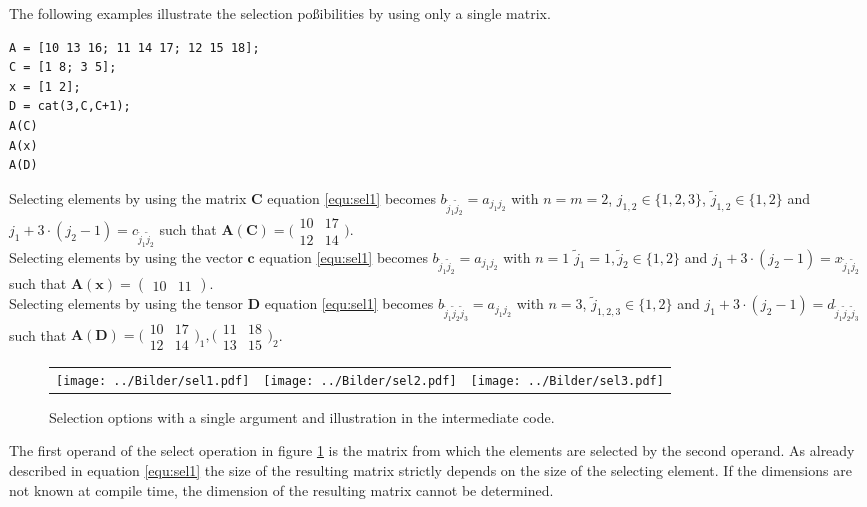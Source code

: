 The following examples illustrate the selection po\ss ibilities by using only a single matrix.
\begin{lstlisting}[caption={Example of equation \ref{equ:sel1}}]
A = [10 13 16; 11 14 17; 12 15 18];
C = [1 8; 3 5];
x = [1 2];
D = cat(3,C,C+1);
A(C)
A(x)
A(D)
\end{lstlisting}
Selecting elements by using the matrix $\mathbf{C}$ equation \ref{equ:sel1} becomes $b_{\tilde{j}_1\tilde{j}_2} = a_{j_1j_2}$ with  $n=m=2$, $j_{1,2}\in\{1,2,3\}$, $\tilde{j}_{1,2}\in\{1,2\}$ and $j_1+3\cdot (j_2-1) = c_{\tilde{j}_1\tilde{j}_2}$ such that $\mathbf{A}(\mathbf{C}) = \bigl( \begin{smallmatrix} 10&17\\12&14 \end{smallmatrix} \bigr)$.\\
Selecting elements by using the vector $\mathbf{c}$ equation \ref{equ:sel1} becomes $b_{\tilde{j}_1\tilde{j}_2} = a_{j_1j_2}$ with  $n=1$ $\tilde{j}_1 =1,\tilde{j}_2\in\{1,2\}$ and $j_1+3\cdot (j_2-1) = x_{\tilde{j}_1\tilde{j}_2}$ such that $\mathbf{A}(\mathbf{x}) = ( \begin{smallmatrix} 10&11\end{smallmatrix} )$.\\
Selecting elements by using the tensor $\mathbf{D}$ equation \ref{equ:sel1} becomes $b_{\tilde{j}_1\tilde{j}_2\tilde{j}_3} = a_{j_1j_2}$ with  $n=3$, $\tilde{j}_{1,2,3}\in\{1,2\}$ and $j_1+3\cdot (j_2-1) = d_{\tilde{j}_1\tilde{j}_2\tilde{j}_3}$ such that $\mathbf{A}(\mathbf{D}) = \bigl( \begin{smallmatrix} 10&17\\12&14 \end{smallmatrix} \bigr)_1, \bigl( \begin{smallmatrix} 11&18\\13&15 \end{smallmatrix} \bigr)_2$.

\begin{figure}[!ht]
\label{fig:sel1}
\centering
\begin{tabular}{ccc}
\texttt{[image: ../Bilder/sel1.pdf]} &
\texttt{[image: ../Bilder/sel2.pdf]} &
\texttt{[image: ../Bilder/sel3.pdf]}
\end{tabular}
\caption{Selection options with a single argument and illustration in the intermediate code.}
\end{figure}

The first operand of the select operation in figure \ref{fig:sel1} is the matrix from which the elements are selected by the second operand. As already described in equation \ref{equ:sel1} the size of the resulting matrix strictly depends on the size of the selecting element. If the dimensions are not known at compile time, the dimension of the resulting matrix cannot be determined.


